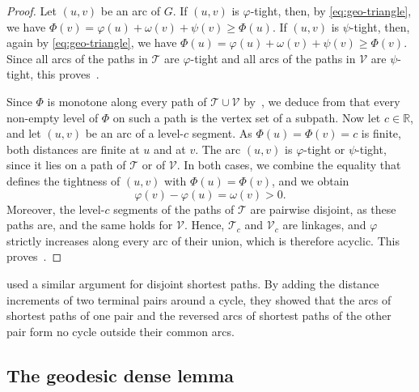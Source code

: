 \documentclass[fontsize=12pt,leading=14pt]{fullpaper}
\newcommand{\Tcal}{\mathcal{T}}
\newcommand{\Vcal}{\mathcal{V}}
\begin{document}
\begin{proof}
  Let $(u,v)$ be an arc of $G$.
  If $(u,v)$ is $\varphi$-tight, then, by \eqref{eq:geo-triangle}, we have $\Phi(v)=\varphi(u)+\omega(v)+\psi(v)\ge\Phi(u)$.
  If $(u,v)$ is $\psi$-tight, then, again by \eqref{eq:geo-triangle}, we have $\Phi(u)=\varphi(u)+\omega(v)+\psi(v)\ge\Phi(v)$.
  Since all arcs of the paths in $\Tcal$ are $\varphi$-tight and all arcs of the paths in $\Vcal$ are $\psi$-tight, this proves~.

  Since $\Phi$ is monotone along every path of $\Tcal\cup\Vcal$ by~, we deduce from  that every non-empty level of $\Phi$ on such a path is the vertex set of a subpath.
  Now let $c\in\mathbb R$, and let $(u,v)$ be an arc of a level-$c$ segment.
  As $\Phi(u)=\Phi(v)=c$ is finite, both distances are finite at $u$ and at $v$.
  The arc $(u,v)$ is $\varphi$-tight or $\psi$-tight, since it lies on a path of $\Tcal$ or of $\Vcal$.
  In both cases, we combine the equality that defines the tightness of $(u,v)$ with $\Phi(u)=\Phi(v)$, and we obtain
  \[
    \varphi(v)-\varphi(u)=\omega(v)>0.
  \]
  Moreover, the level-$c$ segments of the paths of $\Tcal$ are pairwise disjoint, as these paths are, and the same holds for $\Vcal$.
  Hence, $\Tcal_c$ and $\Vcal_c$ are linkages, and $\varphi$ strictly increases along every arc of their union, which is therefore acyclic.
  This proves~.
\end{proof}

\textcite[Lemma~7]{BercziK17} used a similar argument for disjoint shortest paths.
By adding the distance increments of two terminal pairs around a cycle, they showed that the arcs of shortest paths of one pair and the reversed arcs of shortest paths of the other pair form no cycle outside their common arcs.

\subsection{The geodesic dense lemma}\label{sec:gdl}
\end{document}

